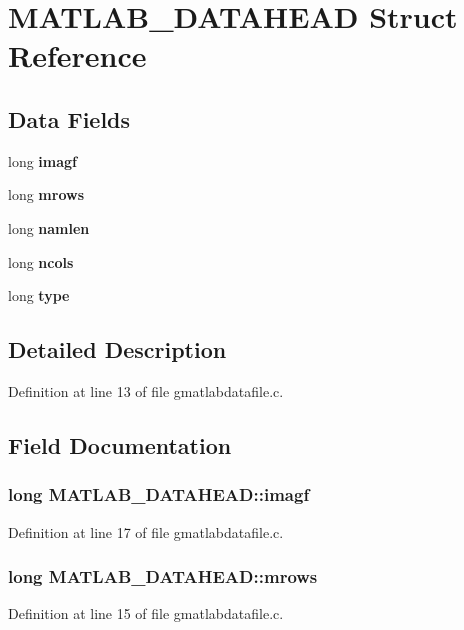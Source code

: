 \section{MATLAB\_\-DATAHEAD Struct Reference}
\label{structMATLAB__DATAHEAD}
\subsection*{Data Fields}
\begin{DoxyCompactItemize}
\item 
long {\bf imagf}
\item 
long {\bf mrows}
\item 
long {\bf namlen}
\item 
long {\bf ncols}
\item 
long {\bf type}
\end{DoxyCompactItemize}


\subsection{Detailed Description}


Definition at line 13 of file gmatlabdatafile.c.

\subsection{Field Documentation}
\subsubsection[{imagf}]{\setlength{\rightskip}{0pt plus 5cm}long {\bf MATLAB\_\-DATAHEAD::imagf}}\label{structMATLAB__DATAHEAD_a7831e4f01682863fce4ba98071a7db08}


Definition at line 17 of file gmatlabdatafile.c.
\subsubsection[{mrows}]{\setlength{\rightskip}{0pt plus 5cm}long {\bf MATLAB\_\-DATAHEAD::mrows}}\label{structMATLAB__DATAHEAD_abf1ef02c93522915bd7fdf9f72df44b7}


Definition at line 15 of file gmatlabdatafile.c.
